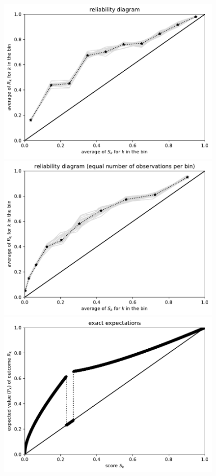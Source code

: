 \documentclass{article}
\begin{document}
\begin{figure}
\begin{centering}
\parbox{\imsize}{\includegraphics[width=\imsize]
                {./codes/unweighted/10000_10_1_2/equiprob.pdf}}
\quad\quad
\parbox{\imsize}{\includegraphics[width=\imsize]
                {./codes/unweighted/10000_10_1_2/equisamp.pdf}}

\vspace{\vertsep}

\parbox{\imsize}{\includegraphics[width=\imsize]
                {./codes/unweighted/10000_10_1_2/exact.pdf}}


\end{centering}
\end{figure}
\end{document}
